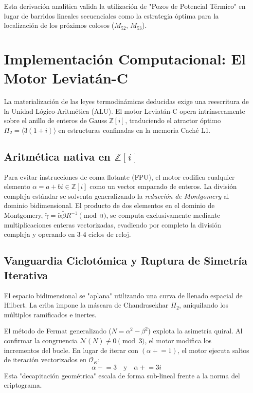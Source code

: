 \documentclass[12pt, a4paper]{article}
\theoremstyle{plain}
\theoremstyle{definition}
\theoremstyle{remark}
\newcommand{\Z}{\mathbb{Z}}
\newcommand{\OK}{\mathcal{O}_K}
\newcommand{\Norm}{\mathcal{N}}
\begin{document}
Esta derivación analítica valida la utilización de "Pozos de Potencial Térmico" en lugar de barridos lineales secuenciales como la estrategia óptima para la localización de los próximos colosos ($M_{52}$, $M_{53}$).

\section{Implementación Computacional: El Motor Leviatán-C}
\label{sec:implementacion}

La materialización de las leyes termodinámicas deducidas exige una reescritura de la Unidad Lógico-Aritmética (ALU). El motor Leviatán-C opera intrínsecamente sobre el anillo de enteros de Gauss $\Z[i]$, traduciendo el atractor óptimo $\Pi_2 = \langle 3(1+i) \rangle$ en estructuras confinadas en la memoria Caché L1.

\subsection{Aritmética nativa en \texorpdfstring{$\Z[i]$}{Z[i]}}

Para evitar instrucciones de coma flotante (FPU), el motor codifica cualquier elemento $\alpha = a + bi \in \Z[i]$ como un vector empacado de enteros.
La división compleja estándar se solventa generalizando la \textit{reducción de Montgomery} al dominio bidimensional. El producto de dos elementos en el dominio de Montgomery, $\tilde{\gamma} = \tilde{\alpha} \tilde{\beta} R^{-1} \pmod{\mathfrak{n}}$, se computa exclusivamente mediante multiplicaciones enteras vectorizadas, evadiendo por completo la división compleja y operando en 3-4 ciclos de reloj.

\subsection{Vanguardia Ciclotómica y Ruptura de Simetría Iterativa}

El espacio bidimensional se "aplana" utilizando una curva de llenado espacial de Hilbert. La criba impone la máscara de Chandrasekhar $\Pi_2$, aniquilando los múltiplos ramificados e inertes.

El método de Fermat generalizado ($N = \alpha^2 - \beta^2$) explota la asimetría quiral. Al confirmar la congruencia $\Norm(N) \not\equiv 0 \pmod 3$, el motor modifica los incrementos del bucle. En lugar de iterar con $(\alpha \mathrel{+}= 1)$, el motor ejecuta saltos de iteración vectorizados en $\OK$:
\begin{equation}
    \alpha \mathrel{+}= 3 \quad \text{y} \quad \alpha \mathrel{+}= 3i
\end{equation}
Esta "decapitación geométrica" escala de forma sub-lineal frente a la norma del criptograma.
\end{document}
